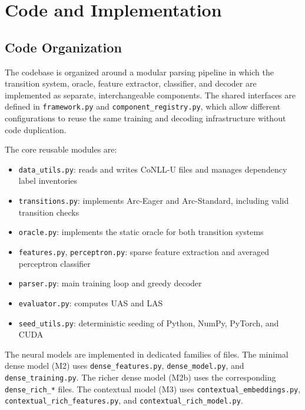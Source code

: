 \documentclass[12pt,letterpaper]{article}
\begin{document}
\section{Code and Implementation}
\label{sec:cs_implementation}

\subsection{Code Organization}
\label{subsec:code_organization}

The codebase is organized around a modular parsing pipeline in which the transition system, oracle, feature extractor, classifier, and decoder are implemented as separate, interchangeable components. The shared interfaces are defined in \texttt{framework.py} and \texttt{component\_registry.py}, which allow different configurations to reuse the same training and decoding infrastructure without code duplication.

The core reusable modules are:

\begin{itemize}
    \item \texttt{data\_utils.py}: reads and writes CoNLL-U files and manages dependency label inventories
    \item \texttt{transitions.py}: implements Arc-Eager and Arc-Standard, including valid transition checks
    \item \texttt{oracle.py}: implements the static oracle for both transition systems
    \item \texttt{features.py}, \texttt{perceptron.py}: sparse feature extraction and averaged perceptron classifier
    \item \texttt{parser.py}: main training loop and greedy decoder
    \item \texttt{evaluator.py}: computes UAS and LAS
    \item \texttt{seed\_utils.py}: deterministic seeding of Python, NumPy, PyTorch, and CUDA
\end{itemize}

The neural models are implemented in dedicated families of files. The minimal dense model (M2) uses \texttt{dense\_features.py}, \texttt{dense\_model.py}, and \newline  \texttt{dense\_training.py}. The richer dense model (M2b) uses the corresponding \texttt{dense\_rich\_*} files. The contextual model (M3) uses \texttt{contextual\_embeddings.py}, \texttt{contextual\_rich\_features.py}, and \texttt{contextual\_rich\_model.py}.
\end{document}
